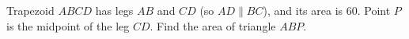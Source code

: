Trapezoid $ABCD$ has legs $AB$ and $CD$ (so $AD\parallel BC$), and its area is $60$. Point $P$ is the midpoint of the leg $CD$. Find the area of triangle $ABP$.
